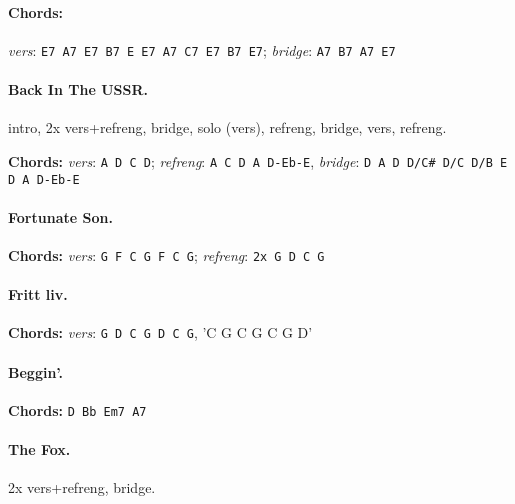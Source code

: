 \documentclass[%
twoside,                 %
final,                   %
10pt]{article}
\begin{document}
\paragraph{Chords:}
\emph{vers}: \Verb!E7 A7 E7 B7 E E7 A7 C7 E7 B7 E7!; \emph{bridge}: \Verb!A7 B7 A7 E7!










\paragraph{Back In The USSR.}
intro, 2x vers+refreng, bridge, solo (vers), refreng, bridge, vers, refreng.

\textbf{Chords:} \emph{vers}: \Verb!A D C D!; \emph{refreng}: \Verb!A C D A D-Eb-E!,
\emph{bridge}: \Verb!D A D D/C# D/C D/B E D A D-Eb-E!





\paragraph{Fortunate Son.}

\textbf{Chords:} \emph{vers}: \Verb!G F C G F C G!; \emph{refreng}: \Verb!2x G D C G!





\paragraph{Fritt liv.}

\textbf{Chords:} \emph{vers}: \Verb!G D C G D C G!, 'C G C G C G D'




\paragraph{Beggin'.}
\textbf{Chords:} \Verb!D Bb Em7 A7!




\paragraph{The Fox.}
2x vers+refreng, bridge.
\end{document}
